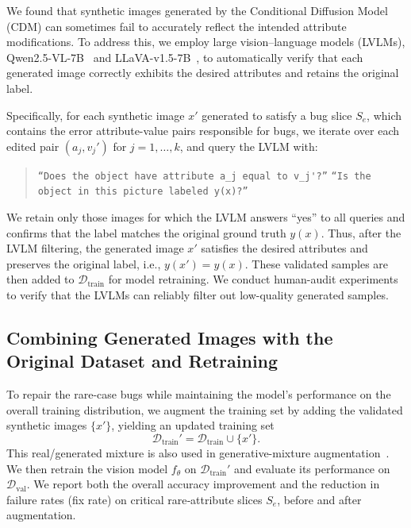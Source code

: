 \documentclass[10pt]{article} %
\newcommand{\qwen}{Qwen2.5-VL\xspace}
\newcommand{\llava}{LLaVA-v1.5\xspace}
\begin{document}
We found that synthetic images generated by the Conditional Diffusion Model (CDM) can sometimes fail to accurately reflect the intended attribute modifications. To address this, we employ large vision--language models (LVLMs), \qwen{}-7B~\citep{bai2025qwen25vl} and \llava{}-7B~\citep{liu2023improvedllava}, to automatically verify that each generated image correctly exhibits the desired attributes and retains the original label.

Specifically, for each synthetic image \(x'\) generated to satisfy a bug slice \(S_e\), which contains the error attribute-value pairs responsible for bugs, we iterate over each edited pair \((a_j, v_j')\) for \(j = 1, \dots, k\), and query the LVLM with: 
\vspace{-3pt}
\begin{quote}
\centering
\setlength{\parskip}{0pt}
\setlength{\parsep}{0pt}
\texttt{``Does the object have attribute \(a_j\) equal to \(v_j'\)?''} \newline
\texttt{``Is the object in this picture labeled \(y(x)\)?''}
\end{quote}

We retain only those images for which the LVLM answers “yes” to all queries and confirms that the label matches the original ground truth \(y(x)\). Thus, after the LVLM filtering, the generated image \(x'\) satisfies the desired attributes and preserves the original label, i.e., \(y(x') = y(x)\). These validated samples are then added to \(\mathcal{D}_{\mathrm{train}}\) for model retraining. We conduct human-audit experiments to verify that the LVLMs can reliably filter out low-quality generated samples.



\subsection{Combining Generated Images with the Original Dataset and Retraining}
To repair the rare-case bugs while maintaining the model's performance on the overall training distribution, we augment the training set by adding the validated synthetic images \(\{x'\}\), yielding an updated training set
\[
\mathcal{D}_{\mathrm{train}}' = \mathcal{D}_{\mathrm{train}} \cup \{x'\}.
\]
This real/generated mixture is also used in generative-mixture augmentation~\citep{lee2024genmix}.
We then retrain the vision model \(f_\theta\) on \(\mathcal{D}_{\mathrm{train}}'\) and evaluate its performance on \(\mathcal{D}_{\mathrm{val}}\). We report both the overall accuracy improvement and the reduction in failure rates (fix rate) on critical rare‐attribute slices \(S_e\), before and after augmentation.
\end{document}

